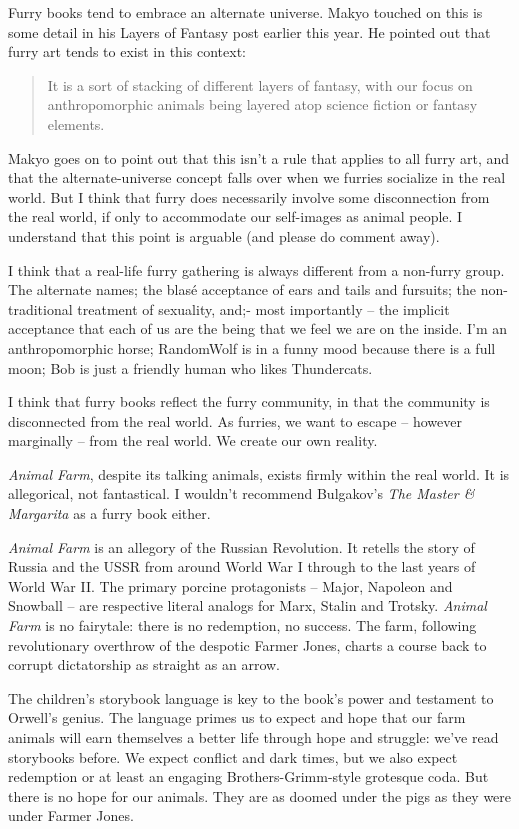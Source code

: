 Furry books tend to embrace an alternate universe. Makyo touched on this is some detail in his Layers of Fantasy post earlier this year. He pointed out that furry art tends to exist in this context:

\begin{quote}
  It is a sort of stacking of different layers of fantasy, with our focus on anthropomorphic animals being layered atop science fiction or fantasy elements.
\end{quote}

Makyo goes on to point out that this isn't a rule that applies to all furry art, and that the alternate-universe concept falls over when we furries socialize in the real world. But I think that furry does necessarily involve some disconnection from the real world, if only to accommodate our self-images as animal people. I understand that this point is arguable (and please do comment away).

I think that a real-life furry gathering is always different from a non-furry group. The alternate names; the blasé acceptance of ears and tails and fursuits; the non-traditional treatment of sexuality, and;- most importantly -- the implicit acceptance that each of us are the being that we feel we are on the inside. I'm an anthropomorphic horse; RandomWolf is in a funny mood because there is a full moon; Bob is just a friendly human who likes Thundercats.

I think that furry books reflect the furry community, in that the community is disconnected from the real world. As furries, we want to escape -- however marginally -- from the real world. We create our own reality.

\textit{Animal Farm}, despite its talking animals, exists firmly within the real world. It is allegorical, not fantastical. I wouldn't recommend Bulgakov's \textit{The Master \& Margarita} as a furry book either.

\textit{Animal Farm} is an allegory of the Russian Revolution. It retells the story of Russia and the USSR from around World War I through to the last years of World War II. The primary porcine protagonists -- Major, Napoleon and Snowball -- are respective literal analogs for Marx, Stalin and Trotsky. \textit{Animal Farm} is no fairytale: there is no redemption, no success. The farm, following revolutionary overthrow of the despotic Farmer Jones, charts a course back to corrupt dictatorship as straight as an arrow.

The children's storybook language is key to the book's power and testament to Orwell's genius. The language primes us to expect and hope that our farm animals will earn themselves a better life through hope and struggle: we've read storybooks before. We expect conflict and dark times, but we also expect redemption or at least an engaging Brothers-Grimm-style grotesque coda. But there is no hope for our animals. They are as doomed under the pigs as they were under Farmer Jones.

